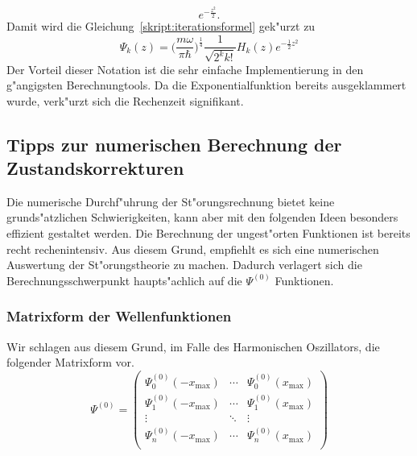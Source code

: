 \begin{refsection}
\[e^{-\frac{z^2}2}.
\]
Damit wird die Gleichung~\ref{skript:iterationsformel} gek"urzt zu
\begin{equation}
\Psi_k(z)
=
\biggl(\frac{m\omega}{\pi\hbar}\biggr)^\frac14
\frac1{\sqrt{2^k k!}}H_k(z)
e^{-\frac12 z^2}
\end{equation}
Der Vorteil dieser Notation ist die sehr einfache Implementierung
in den g"angigsten Berechnungtools.
Da die Exponentialfunktion bereits ausgeklammert wurde, verk"urzt sich die Rechenzeit
signifikant.
\subsection{Tipps zur numerischen Berechnung der Zustandskorrekturen}
Die numerische Durchf"uhrung der St"orungsrechnung bietet keine grunds"atzlichen 
Schwierigkeiten, kann aber mit den folgenden Ideen besonders effizient 
gestaltet werden.
Die Berechnung der ungest"orten Funktionen ist bereits recht rechenintensiv.
Aus diesem Grund,
empfiehlt es sich eine numerischen Auswertung der St"orungstheorie zu machen.
Dadurch verlagert sich die Berechnungsschwerpunkt
haupts"achlich auf die $\Psi^{(0)}$ Funktionen.
\subsubsection{Matrixform der Wellenfunktionen}
Wir schlagen aus diesem Grund,
im Falle des Harmonischen Oszillators, die folgender Matrixform vor.
\[
\Psi^{(0)}
=
\begin{pmatrix}
\Psi_0^{(0)}(-x_{\text{max}}) & \cdots & \Psi_0^{(0)}(x_{\text{max}})	\\
\Psi_1^{(0)}(-x_{\text{max}}) & \cdots & \Psi_1^{(0)}(x_{\text{max}})	\\
\vdots & \ddots & \vdots						\\
\Psi_n^{(0)}(-x_{\text{max}}) & \cdots & \Psi_n^{(0)}(x_{\text{max}})	\\
\end{pmatrix}
\]

\end{refsection}
